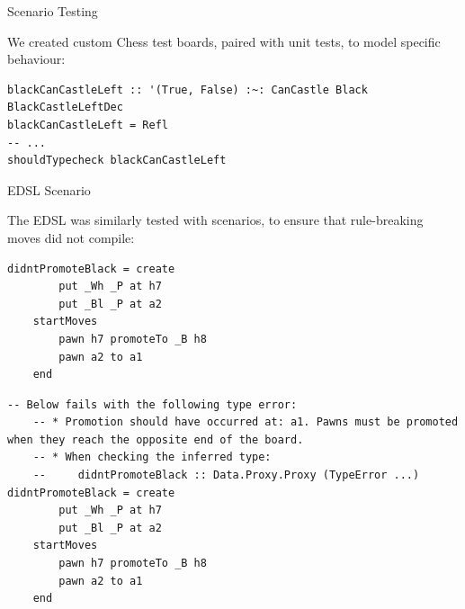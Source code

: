 \documentclass{beamer}
\begin{document}
\begin{frame}[fragile]{Scenario Testing}
    
We created custom Chess test boards, paired with unit tests, to model specific behaviour: %

\begin{figure}[h]
    \centering
    \scalebox{0.55}{\showboard}
    \label{blackcastleleft}
\end{figure}

\begin{lstlisting}
blackCanCastleLeft :: '(True, False) :~: CanCastle Black BlackCastleLeftDec
blackCanCastleLeft = Refl
-- ...
shouldTypecheck blackCanCastleLeft
\end{lstlisting}

\end{frame}

\begin{frame}[fragile]{EDSL Scenario}

The EDSL was similarly tested with scenarios, to ensure that rule-breaking moves did not compile:

\begin{overprint}
    
\begin{lstlisting}
didntPromoteBlack = create
        put _Wh _P at h7
        put _Bl _P at a2
    startMoves
        pawn h7 promoteTo _B h8
        pawn a2 to a1
    end
\end{lstlisting}

\begin{lstlisting}
-- Below fails with the following type error:
    -- * Promotion should have occurred at: a1. Pawns must be promoted when they reach the opposite end of the board.
    -- * When checking the inferred type:
    --     didntPromoteBlack :: Data.Proxy.Proxy (TypeError ...)
didntPromoteBlack = create
        put _Wh _P at h7
        put _Bl _P at a2
    startMoves
        pawn h7 promoteTo _B h8
        pawn a2 to a1
    end
\end{lstlisting}

\end{overprint}
    
\end{frame}
\end{document}
